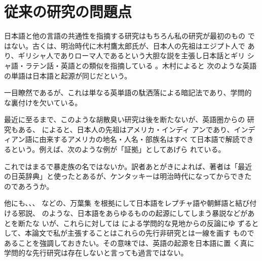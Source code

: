 ﻿\documentclass[11pt,twoside]{jreport}
\begin{document}
\section{従来の研究の問題点}

  日本語と他の言語の共通性を指摘する研究はもちろん私の研究が最初のもの
ではない。古くは、明治時代に木村鷹太郎氏が、日本人の先祖はエジプト人で
あり、ギリシャ人でありローマ人であるという大胆な説を主張し日本話とギリ
シャ語・ラテン話・英語との類似を指摘している \cite{木村81}。木村によると
次のような英語の単語は日本語と起源が同じだという。

\noindent
一目瞭然であるが、これは単なる英単語の駄洒落による暗記法であり、学問的
な裏付けを欠いている。

  最近に至るまで、このような胡散臭い研究は後を断たないが、英語圏からの
研究もある、 によると、日本人の先祖はアメリカ・インディ
アンであり、インディアン語に由来するアメリカの地名・人名・部族名はすべ
て日本語で解読できるという。例えば、次のような例が「証拠」としてあげら
れている。

\noindent
これではまるで暴走族の名ではないか。訳者あとがきによれば、著者は「最近
の日英辞典」と使ったとあるが、ケンタッキーは明治時代になってからできた
のであろうか。

  他にも、、、 などの、万葉集
を根拠にして日本語をレプチャ語や朝鮮語と結び付ける邪説、 
のような、日本語をあらゆるものの起源にしてしまう暴説などがあとを断たな
いが、これらに対しては による学問的な見地からの反論にゆ
ずるとして、本論文で私が主張することはこれらの先行非研究とは一線を画す
ものであることを強調しておきたい。その意味では、英語の起源を日本語に置
く真に学問的な先行研究は存在しないと言っても過言ではない。
\end{document}
